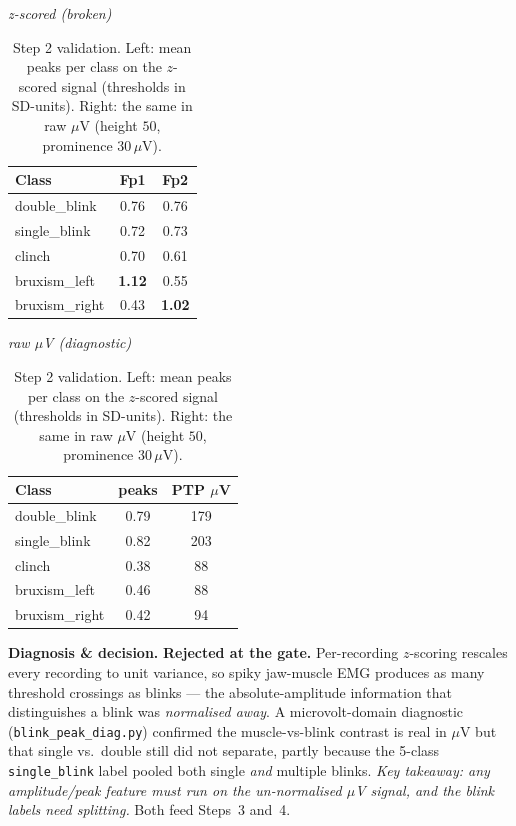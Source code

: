 \documentclass[11pt,a4paper]{article}
\newcommand{\muv}{$\mu$V}
\newcommand{\code}[1]{\texttt{#1}}
\begin{document}
\begin{table}[h]\centering\small
\caption{Step 2 validation. Left: mean peaks per class on the $z$-scored signal
(thresholds in SD-units). Right: the same in raw \muv{} (height $50$, prominence
$30$\,\muv).}
\label{tab:step2val}
\begin{minipage}{0.46\textwidth}\centering
\textit{z-scored (broken)}\\[2pt]
\begin{tabular}{@{}lcc@{}}
\toprule
Class & Fp1 & Fp2 \\\midrule
double\_blink  & 0.76 & 0.76 \\
single\_blink  & 0.72 & 0.73 \\
clinch         & 0.70 & 0.61 \\
bruxism\_left  & \textbf{1.12} & 0.55 \\
bruxism\_right & 0.43 & \textbf{1.02} \\
\bottomrule
\end{tabular}
\end{minipage}\hfill
\begin{minipage}{0.50\textwidth}\centering
\textit{raw \muv{} (diagnostic)}\\[2pt]
\begin{tabular}{@{}lcc@{}}
\toprule
Class & peaks & PTP \muv \\\midrule
double\_blink  & 0.79 & 179 \\
single\_blink  & 0.82 & 203 \\
clinch         & 0.38 & 88 \\
bruxism\_left  & 0.46 & 88 \\
bruxism\_right & 0.42 & 94 \\
\bottomrule
\end{tabular}
\end{minipage}
\end{table}

\textbf{Diagnosis \& decision.} \textbf{Rejected at the gate.} Per-recording
$z$-scoring rescales every recording to unit variance, so spiky jaw-muscle EMG
produces as many threshold crossings as blinks --- the absolute-amplitude
information that distinguishes a blink was \emph{normalised away}. A
microvolt-domain diagnostic (\code{blink\_peak\_diag.py}) confirmed the
muscle-vs-blink contrast is real in \muv{} but that single vs.\ double still did
not separate, partly because the 5-class \code{single\_blink} label pooled both
single \emph{and} multiple blinks. \emph{Key takeaway: any amplitude/peak feature
must run on the un-normalised \muv{} signal, and the blink labels need
splitting.} Both feed Steps~3 and~4.
\end{document}
